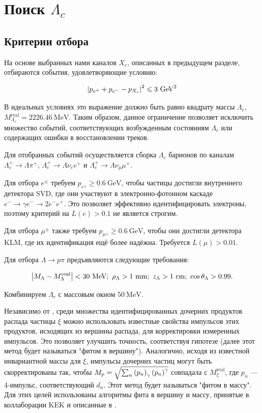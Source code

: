 \section{Поиск $\Lambda_c$}

\subsection{Критерии отбора}
На основе выбранных нами каналов $X_c$, описанных в предыдущем разделе, 
отбираются события, удовлетворяющие условию:

\begin{equation}
    \abs{p_{e^+} + p_{e^-} - p_{X_c}}^2 \leqslant 3 \ \text{GeV}^2
\end{equation}

В идеальных условиях это выражение должно быть равно квадрату массы $\Lambda_c$, 
$M^{\text{real}}_{\Lambda_c} = 2226.46 \ \text{MeV}$. Таким образом, данное ограничение позволяет исключить множество событий, соответствующих возбужденным состояниям $\Lambda_c$ или содержащих ошибки в восстановлении треков.

Для отобранных событий осуществляется сборка $\Lambda_c$ барионов по каналам 
$\Lambda_c^+ \to \Lambda \pi^+$, $\Lambda_c^+ \to \Lambda \nu_e e^+$ и $\Lambda_c^+ \to \Lambda \nu_\mu \mu^+$.

\newdot Для отбора $e^\pm$ требуем $p_{e^\pm} \geq 0.6 \ \text{GeV}$, чтобы частицы достигли внутреннего детектора SVD, где они участвуют в электронно-фотонном каскаде $e^- \to \gamma e^- \to 2e^- e^+$. Это позволяет эффективно идентифицировать электроны, поэтому критерий на $L(e) > 0.1$ не является строгим.

\newdot Для отбора $\mu^\pm$ также требуем $p_{\mu^\pm} \geq 0.6 \ \text{GeV}$, чтобы они достигли детектора KLM, где их идентификация ещё более надёжна. Требуется $L(\mu) > 0.01$.

\newdot Для отбора $\Lambda \to p \pi$ предъявляются следующие требования:

$$
\abs{ M_{\Lambda} - M^{\text{real}}_{\Lambda} } < 30 \ \text{MeV}; 
\ \rho_{\Lambda} > 1 \ \text{mm}; \ z_{\Lambda} > 1 \ \text{cm}; 
\ \cos \theta_{\Lambda} > 0.99.
$$

\newdot Комбинируем $\Lambda_c$ с массовым окном $50 \ \text{MeV}$.

\newdot Независимо от \cite{BelleDetector2002}, среди множества идентифицированных дочерних продуктов распада частицы $\xi$ можно использовать известные свойства импульсов этих продуктов, исходящих из вершины распада, для корректировки измеренных импульсов. Это позволяет улучшить точность, соответствуя гипотезе (далее этот метод будет называться "фитом в вершину"). Аналогично, исходя из известной инвариантной массы для $\xi$, импульсы дочерних частиц могут быть скорректированы так, чтобы $M_p = \sqrt{\sum_n \left( p_n \right)_\gamma \left( p_n \right)^\gamma}$ совпадала с $M^{\text{real}}_{\xi}$, где $p_n$ — 4-импульс, соответствующий $d_n$. Этот метод будет называться "фитом в массу". Для этих целей использованы алгоритмы фита в вершину и массу, принятые в коллаборации KEK и описанные в \cite{Krohn2021}.

